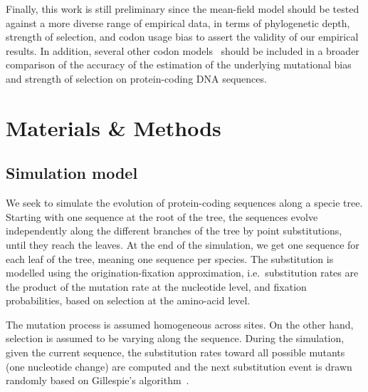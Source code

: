 \documentclass{article}
\begin{document}
Finally, this work is still preliminary since the mean-field model should be tested against a more diverse range of empirical data, in terms of phylogenetic depth, strength of selection, and {codon usage bias} to assert the validity of our empirical results.
In addition, several other codon models~\citep{Rodrigue2008a,KosakovskyPond2020} should be included in a broader comparison of the accuracy of the estimation of the underlying mutational bias and strength of selection on protein-coding {DNA} sequences.


\section{Materials \& Methods}

\subsection{Simulation model}
\label{sec:mut-bias-simu}
We seek to simulate the evolution of protein-coding sequences along a specie tree.
Starting with one sequence at the root of the tree, the sequences evolve independently along the different branches of the tree by point {substitutions}, until they reach the leaves.
At the end of the simulation, we get one sequence for each leaf of the tree, meaning one sequence per species.
The {substitution} is modelled using the origination-fixation approximation, i.e.~substitution rates are the product of the mutation rate at the nucleotide level, and fixation probabilities, based on selection at the amino-acid level.

The mutation process is assumed homogeneous across sites.
On the other hand, selection is assumed to be varying along the sequence.
During the simulation, given the current sequence, the {substitution} rates toward all possible mutants (one nucleotide change) are computed and the next {substitution} event is drawn randomly based on Gillespie’s algorithm~\citep{Gillespie1977}.
\end{document}
